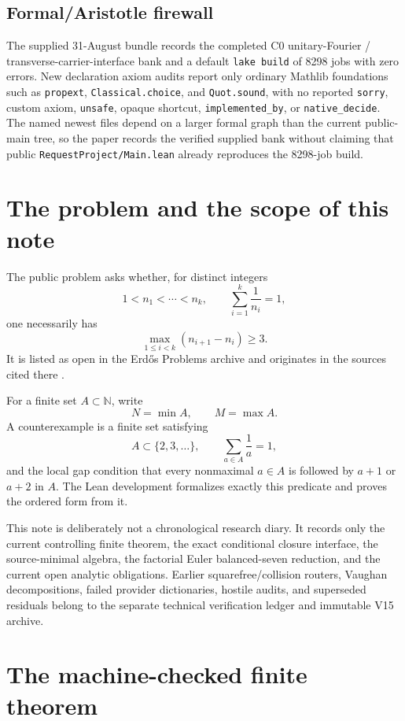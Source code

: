 \documentclass[11pt]{article}
\theoremstyle{definition}
\newcommand{\N}{\mathbb N}
\newcommand{\1}{\mathbf 1}
\begin{document}
\subsection{Formal/Aristotle firewall}
The supplied 31-August bundle records the completed C0 unitary-Fourier /
transverse-carrier-interface bank and a default \texttt{lake build} of 8298 jobs with zero
errors. New declaration axiom audits report only ordinary Mathlib foundations such as
\texttt{propext}, \texttt{Classical.choice}, and \texttt{Quot.sound}, with no reported
\texttt{sorry}, custom axiom, \texttt{unsafe}, opaque shortcut, \texttt{implemented\_by}, or
\texttt{native\_decide}. The named newest files depend on a larger formal graph than the
current public-main tree, so the paper records the verified supplied bank without claiming
that public \texttt{RequestProject/Main.lean} already reproduces the 8298-job build.

\section{The problem and the scope of this note}

The public problem asks whether, for distinct integers
\[
1<n_1<\cdots<n_k,\qquad \sum_{i=1}^k\frac1{n_i}=1,
\]
one necessarily has
\[
\max_{1\le i<k}(n_{i+1}-n_i)\ge3.
\]
It is listed as open in the Erd\H{o}s Problems archive and originates in the sources
cited there \cite{ErdosGraham1980,ErdosProblems287}.

For a finite set $A\subset\N$, write
\[
N=\min A,\qquad M=\max A.
\]
A counterexample is a finite set satisfying
\[
A\subset\{2,3,\dots\},\qquad \sum_{a\in A}\frac1a=1,
\]
and the local gap condition that every nonmaximal $a\in A$ is followed by $a+1$ or $a+2$
in $A$.  The Lean development formalizes exactly this predicate and proves the ordered
form from it.

This note is deliberately not a chronological research diary.  It records only the
current controlling finite theorem, the exact conditional closure interface, the
source-minimal algebra, the factorial Euler balanced-seven reduction, and the current open
analytic obligations.  Earlier squarefree/collision routers, Vaughan decompositions, failed
provider dictionaries, hostile audits, and superseded residuals belong to the separate technical
verification ledger and immutable V15 archive.

\section{The machine-checked finite theorem}
\end{document}
